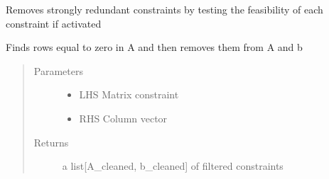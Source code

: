 \documentclass[letterpaper,10pt,english]{sphinxmanual}
\begin{document}

\begin{fulllineitems}
\label{\detokenize{mpo.utils:mpo.utils.constraint_utilities.remove_strongly_redundant_constraints}}
\sphinxAtStartPar
Removes strongly redundant constraints by testing the feasibility of each constraint if activated

\end{fulllineitems}


\begin{fulllineitems}
\label{\detokenize{mpo.utils:mpo.utils.constraint_utilities.remove_zero_rows}}
\sphinxAtStartPar
Finds rows equal to zero in A and then removes them from A and b
\begin{quote}\begin{description}
\item[{Parameters}] \leavevmode\begin{itemize}
\item {} 
\sphinxAtStartPar
{} \textendash{} LHS Matrix constraint

\item {} 
\sphinxAtStartPar
{} \textendash{} RHS Column vector

\end{itemize}

\item[{Returns}] \leavevmode
\sphinxAtStartPar
a list{[}A\_cleaned, b\_cleaned{]} of filtered constraints

\end{description}\end{quote}

\end{fulllineitems}
\end{document}
